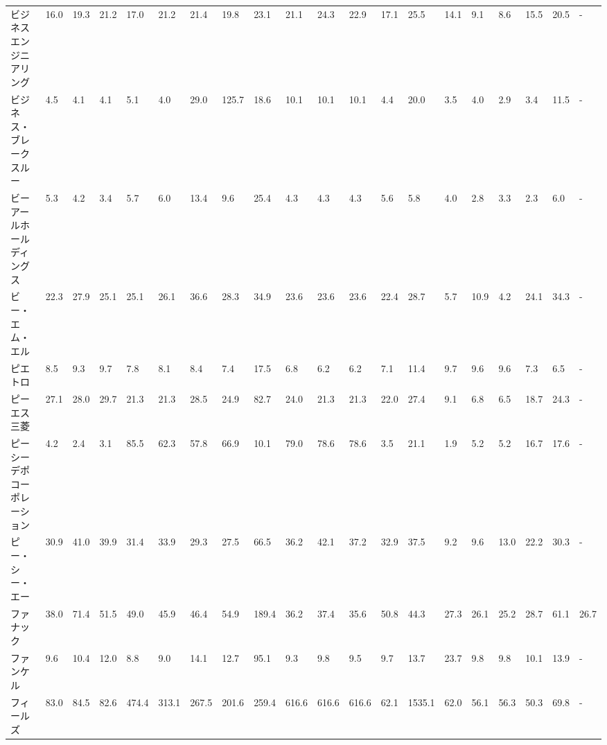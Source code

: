 \begin{tabular}{llllllllllllllllllll}
ビジネスエンジニアリング    &   16.0 &   19.3 &      21.2 &      17.0 &       21.2 &    21.4 &    19.8 &     23.1 &    21.1 &    24.3 &   22.9 &   17.1 &    25.5 &    14.1 &     9.1 &    8.6 &   15.5 &    20.5 &      - \\
ビジネス・ブレークスルー    &    4.5 &    4.1 &       4.1 &       5.1 &        4.0 &    29.0 &   125.7 &     18.6 &    10.1 &    10.1 &   10.1 &    4.4 &    20.0 &     3.5 &     4.0 &    2.9 &    3.4 &    11.5 &      - \\
ビーアールホールディングス   &    5.3 &    4.2 &       3.4 &       5.7 &        6.0 &    13.4 &     9.6 &     25.4 &     4.3 &     4.3 &    4.3 &    5.6 &     5.8 &     4.0 &     2.8 &    3.3 &    2.3 &     6.0 &      - \\
ビー・エム・エル        &   22.3 &   27.9 &      25.1 &      25.1 &       26.1 &    36.6 &    28.3 &     34.9 &    23.6 &    23.6 &   23.6 &   22.4 &    28.7 &     5.7 &    10.9 &    4.2 &   24.1 &    34.3 &      - \\
ピエトロ            &    8.5 &    9.3 &       9.7 &       7.8 &        8.1 &     8.4 &     7.4 &     17.5 &     6.8 &     6.2 &    6.2 &    7.1 &    11.4 &     9.7 &     9.6 &    9.6 &    7.3 &     6.5 &      - \\
ピーエス三菱          &   27.1 &   28.0 &      29.7 &      21.3 &       21.3 &    28.5 &    24.9 &     82.7 &    24.0 &    21.3 &   21.3 &   22.0 &    27.4 &     9.1 &     6.8 &    6.5 &   18.7 &    24.3 &      - \\
ピーシーデポコーポレーション  &    4.2 &    2.4 &       3.1 &      85.5 &       62.3 &    57.8 &    66.9 &     10.1 &    79.0 &    78.6 &   78.6 &    3.5 &    21.1 &     1.9 &     5.2 &    5.2 &   16.7 &    17.6 &      - \\
ピー・シー・エー        &   30.9 &   41.0 &      39.9 &      31.4 &       33.9 &    29.3 &    27.5 &     66.5 &    36.2 &    42.1 &   37.2 &   32.9 &    37.5 &     9.2 &     9.6 &   13.0 &   22.2 &    30.3 &      - \\
ファナック           &   38.0 &   71.4 &      51.5 &      49.0 &       45.9 &    46.4 &    54.9 &    189.4 &    36.2 &    37.4 &   35.6 &   50.8 &    44.3 &    27.3 &    26.1 &   25.2 &   28.7 &    61.1 &   26.7 \\
ファンケル           &    9.6 &   10.4 &      12.0 &       8.8 &        9.0 &    14.1 &    12.7 &     95.1 &     9.3 &     9.8 &    9.5 &    9.7 &    13.7 &    23.7 &     9.8 &    9.8 &   10.1 &    13.9 &      - \\
フィールズ           &   83.0 &   84.5 &      82.6 &     474.4 &      313.1 &   267.5 &   201.6 &    259.4 &   616.6 &   616.6 &  616.6 &   62.1 &  1535.1 &    62.0 &    56.1 &   56.3 &   50.3 &    69.8 &      - \\

\end{tabular}
